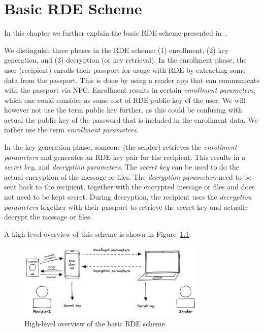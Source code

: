 \chapter{Basic RDE Scheme}
\label{ch:basic-rde-scheme}

In this chapter we further explain the basic RDE scheme presented in~\cite{verheul2017remote}.

We distinguish three phases in the RDE scheme: (1) enrollment, (2) key generation, and (3) decryption (or key retrieval).
In the enrollment phase, the user (recipient) enrolls their passport for usage with RDE by extracting some data from the passport.
This is done by using a reader app that can communicate with the passport via NFC.
Enrollment results in certain \textit{enrollment parameters}, which one could consider as some sort of RDE public key of the user.
We will however not use the term public key further, as this could be confusing with actual the public key of the password that is included in the enrollment data.
We rather use the term \textit{enrollment parameters}.

In the key generation phase, someone (the sender) retrieves the \textit{enrollment parameters} and generates an RDE key pair for the recipient.
This results in a \textit{secret key}, and \textit{decryption parameters}.
The \textit{secret key} can be used to do the actual encryption of the message or files.
The \textit{decryption parameters} need to be sent back to the recipient, together with the encrypted message or files and does not need to be kept secret.
During decryption, the recipient uses the \textit{decryption parameters} together with their passport to retrieve the secret key and actually decrypt the message or files.

A high-level overview of this scheme is shown in Figure~\ref{fig:basic-rde-scheme}.
\begin{figure}
    \centering
    \includegraphics[width=0.8\textwidth]{imgs/RDE overview}
    \caption{High-level overview of the basic RDE scheme.}
    \label{fig:basic-rde-scheme}
\end{figure}

